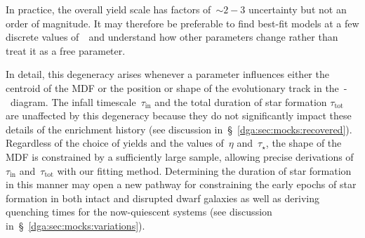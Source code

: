In practice, the overall yield scale has factors of~$\sim$$2 - 3$ uncertainty
but not an order of magnitude.
It may therefore be preferable to find best-fit models at a few discrete
values of~\yacc~and understand how other parameters change rather than treat
it as a free parameter.
\par
In detail, this degeneracy arises whenever a parameter influences either the
centroid of the MDF or the position or shape of the evolutionary track in
the~\afe-\feh~diagram.
The infall timescale~$\tau_\text{in}$ and the total duration of star formation
$\tau_\text{tot}$ are unaffected by this degeneracy because they do not
significantly impact these details of the enrichment history (see discussion
in~\S~\ref{dga:sec:mocks:recovered}).
Regardless of the choice of yields and the values of~$\eta$ and~$\tau_\star$,
the shape of the MDF is constrained by a sufficiently large sample, allowing
precise derivations of~$\tau_\text{in}$ and~$\tau_\text{tot}$ with our fitting
method.
Determining the duration of star formation in this manner may open a new
pathway for constraining the early epochs of star formation in both intact
and disrupted dwarf galaxies as well as deriving quenching times for the
now-quiescent systems (see discussion in~\S~\ref{dga:sec:mocks:variations}).

